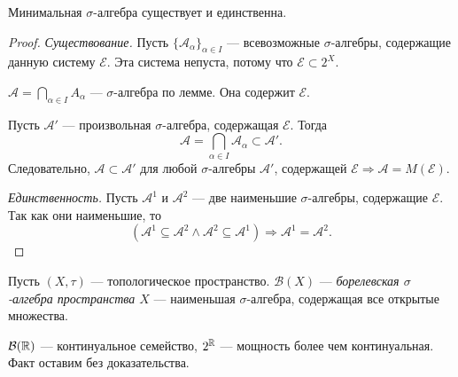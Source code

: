 \begin{theorem}
    Минимальная $\sigma$-алгебра существует и единственна.
\end{theorem} 
\begin{proof}
    \textit{Существование.} Пусть $\{\mathcal{A}_\alpha\}_{\alpha \in I}$ — всевозможные $\sigma$-алгебры, содержащие данную систему $\mathcal{E}$. Эта система непуста, потому что $\mathcal{E} \subset 2^X$.

    $\mathcal{A} = \bigcap\limits_{\alpha \in I} A_\alpha$ — $\sigma$-алгебра по лемме. Она содержит $\mathcal{E}$.

    Пусть $\mathcal{A}'$ — произвольная $\sigma$-алгебра, содержащая $\mathcal{E}$. Тогда $$\mathcal{A} = \bigcap\limits_{\alpha \in I} \mathcal{A}_\alpha \subset \mathcal{A}'.$$
    Следовательно, $\mathcal{A} \subset \mathcal{A}'$ для любой $\sigma$-алгебры $\mathcal{A}'$, содержащей $\mathcal{E} \Longrightarrow \mathcal{A} = M(\mathcal{E})$.

    \textit{Единственность.} Пусть $\mathcal{A}^1$ и $\mathcal{A}^2$ — две наименьшие $\sigma$-алгебры, содержащие $\mathcal{E}$. Так как они наименьшие, то
    \[(\mathcal{A}^1 \subseteq \mathcal{A}^2 \land \mathcal{A}^2 \subseteq \mathcal{A}^1) \Longrightarrow \mathcal{A}^1 = \mathcal{A}^2.\]
\end{proof} 

\begin{definition}
    Пусть $(X, \tau)$ — топологическое пространство. $\mathcal{B}(X)$ — \textit{борелевская $\sigma$-алгебра пространства $X$} — наименьшая $\sigma$-алгебра, содержащая все открытые множества.
\end{definition} 

\begin{remark}
    $\mathcal{B}(\mathbb{R})$ — континуальное семейство, $2^{\mathbb{R}}$ — мощность более чем континуальная. Факт оставим без доказательства.
\end{remark}

